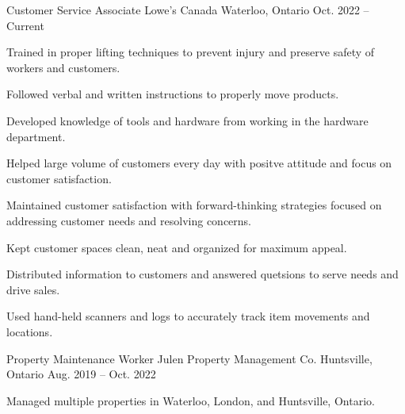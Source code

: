 

\begin{cventries}

  \cventry
    {Customer Service Associate} %
    {Lowe's Canada} %
    {Waterloo, Ontario} %
    {Oct. 2022 -- Current} %
    {
      \begin{cvitems} %
        \item {Trained in proper lifting techniques to prevent injury and preserve safety of workers and customers.}
        \item {}
        \item {Followed verbal and written instructions to properly move products.}
        \item {Developed knowledge of tools and hardware from working in the hardware department.}
        \item {Helped large volume of customers every day with positve attitude and focus on customer satisfaction.}
        \item {Maintained customer satisfaction with forward-thinking strategies focused on addressing customer needs and resolving concerns.}
        \item {Kept customer spaces clean, neat and organized for maximum appeal.}
        \item {Distributed information to customers and answered quetsions to serve needs and drive sales.}
        \item {Used hand-held scanners and logs to accurately track item movements and locations.}
      \end{cvitems}
    }
  \cventry
    {Property Maintenance Worker} %
    {Julen Property Management Co.} %
    {Huntsville, Ontario} %
    {Aug. 2019 -- Oct. 2022} %
    {
      \begin{cvitems} %
        \item {Managed multiple properties in Waterloo, London, and Huntsville, Ontario.}

\end{cvitems}}
\end{cventries}
